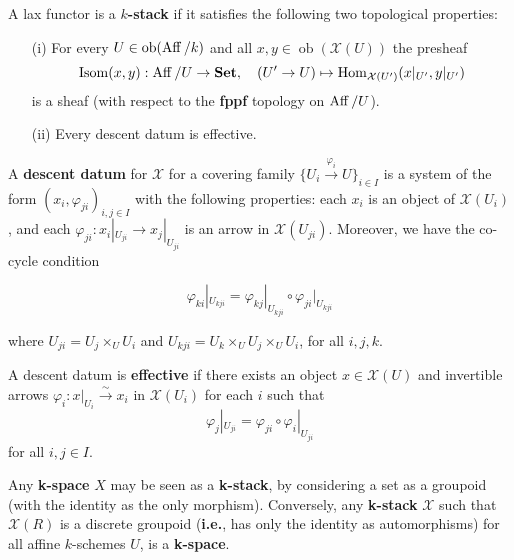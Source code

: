 \documentclass[12pt]{article}
\begin{document}
\begin{definition}
    A lax functor is a \textbf{$k$-stack} if it satisfies the following two topological properties:

    \begin{enumerate}
        \item[(i)] For every $U \in \operatorname{ob}(\operatorname{Aff}/k)$ and all $x, y \in \operatorname{ob}(\mathcal{X}(U))$ the presheaf
              \[
                  \operatorname{Isom}(x,y) : \operatorname{Aff}/U \to \mathbf{Set}, \quad (U' \to U) \mapsto \operatorname{Hom}_{\mathcal{X}(U')}(x|_{U'}, y|_{U'})
              \]
              is a sheaf (with respect to the \textbf{fppf} topology on $\operatorname{Aff}/U$).
        \item[(ii)] Every descent datum is effective.
    \end{enumerate}
\end{definition}

\begin{definition}
    A \textbf{descent datum} for $\mathcal{X}$ for a covering family $\{ U_i \xrightarrow{\varphi_i} U \}_{i \in I}$ is a system of the form
    $(x_i, \varphi_{ji})_{i,j \in I}$ with the following properties: each $x_i$ is an object of $\mathcal{X}(U_i)$, and each
    $\varphi_{ji} : x_i|_{U_{ji}} \to x_j|_{U_{ji}}$ is an arrow in $\mathcal{X}(U_{ji})$. Moreover, we have the co-cycle condition

    \[
        \varphi_{ki}|_{U_{kji}} = \varphi_{kj}|_{U_{kji}} \circ \varphi_{ji}|_{U_{kji}}
    \]

    where $U_{ji} = U_j \times_U U_i$ and $U_{kji} = U_k \times_U U_j \times_U U_i$, for all $i,j,k$.

    A descent datum is \textbf{effective} if there exists an object $x \in \mathcal{X}(U)$ and invertible arrows
    $\varphi_i : x|_{U_i} \xrightarrow{\sim} x_i$ in $\mathcal{X}(U_i)$ for each $i$ such that
    \[
        \varphi_j|_{U_{ji}} = \varphi_{ji} \circ \varphi_i|_{U_{ji}}
    \]
    for all $i,j \in I$.
\end{definition}


Any \textbf{k-space} $X$ may be seen as a \textbf{k-stack}, by considering a set as a groupoid (with the identity as the only morphism).
Conversely, any \textbf{k-stack} $\mathcal{X}$ such that $\mathcal{X}(R)$ is a discrete groupoid (\textbf{i.e.}, has only the identity as automorphisms)
for all affine $k$-schemes $U$, is a \textbf{k-space}.
\end{document}
